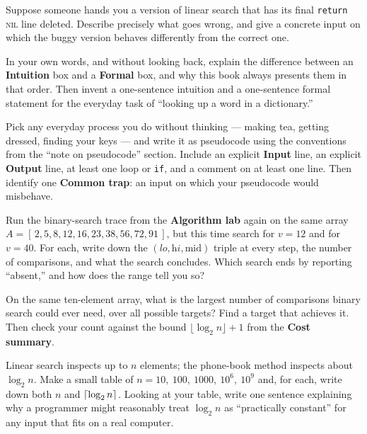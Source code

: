 \begin{exercise}
Suppose someone hands you a version of linear search that has its final
\texttt{return} \textsc{nil} line deleted. Describe precisely what goes wrong, and
give a concrete input on which the buggy version behaves differently from the
correct one.
\end{exercise}

\begin{exercise}
In your own words, and without looking back, explain the difference between an
\textbf{Intuition} box and a \textbf{Formal} box, and why this book always presents
them in that order. Then invent a one-sentence intuition and a one-sentence formal
statement for the everyday task of ``looking up a word in a dictionary.''
\end{exercise}

\begin{exercise}
Pick any everyday process you do without thinking --- making tea, getting dressed,
finding your keys --- and write it as pseudocode using the conventions from the
``note on pseudocode'' section. Include an explicit \textbf{Input} line, an
explicit \textbf{Output} line, at least one loop or \texttt{if}, and a comment
on at least one line. Then identify one
\textbf{Common trap}: an input on which your pseudocode would misbehave.
\end{exercise}

\begin{exercise}
Run the binary-search trace from the \textbf{Algorithm lab} again on the same
array $A = [\,2,5,8,12,16,23,38,56,72,91\,]$, but this time search for $v = 12$
and for $v = 40$. For each, write down the $(\textit{lo},\textit{hi},\text{mid})$
triple at every step, the number of comparisons, and what the search concludes.
Which search ends by reporting ``absent,'' and how does the range tell you so?
\end{exercise}

\begin{exercise}
On the same ten-element array, what is the largest number of comparisons binary
search could ever need, over all possible targets? Find a target that achieves it.
Then check your count against the bound $\lfloor\log_2 n\rfloor + 1$ from the
\textbf{Cost summary}.
\end{exercise}

\begin{exercise}[Challenge]
Linear search inspects up to $n$ elements; the phone-book method inspects about
$\log_2 n$. Make a small table of $n = 10,\ 100,\ 1000,\ 10^6,\ 10^9$ and, for
each, write down both $n$ and $\lceil\log_2 n\rceil$. Looking at your table, write one
sentence explaining why a programmer might reasonably treat $\log_2 n$ as
``practically constant'' for any input that fits on a real computer.
\end{exercise}
